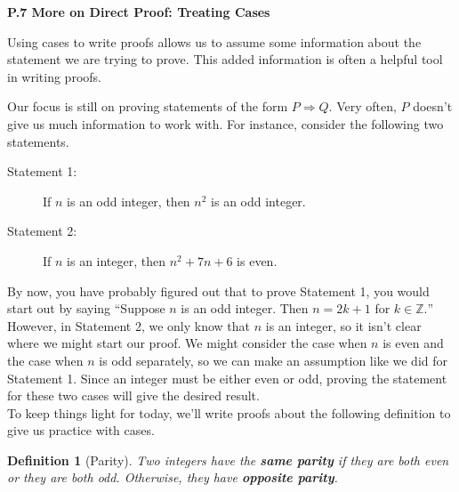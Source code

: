 \documentclass[12 pt]{article}
\newcommand{\Z}{\mathbb{Z}}
\theoremstyle{definition}
\theoremstyle{plain}
\theoremstyle{mytheorem}
\theoremstyle{myexample}
\theoremstyle{mydefinition}
\newtheorem{definition}{Definition}
\begin{document}
\begin{center}
\textbf{P.7 More on Direct Proof: Treating Cases}
\end{center}

Using cases to write proofs allows us to assume some information about the statement we are trying to prove.  This added information is often a helpful tool in writing proofs.

\begin{center}
\end{center}

\noindent Our focus is still on proving statements of the form $P \Rightarrow Q$.  Very often, $P$ doesn't give us much information to work with.  For instance, consider the following two statements.
	\begin{description}
	\item[Statement 1:]  If $n$ is an odd integer, then $n^2$ is an odd integer.
	\item[Statement 2:]  If $n$ is an integer, then $n^2+7n+6$ is even.
	\end{description}
	
By now, you have probably figured out that to prove Statement 1, you would start out by saying ``Suppose $n$ is an odd integer.  Then $n=2k+1$ for $k \in \Z.$''  However, in Statement 2, we only know that $n$ is an integer, so it isn't clear where we might start our proof.  We might consider the case when $n$ is even and the case when $n$ is odd separately, so we can make an assumption like we did for Statement 1.  Since an integer must be either even or odd, proving the statement for these two cases will give the desired result.  \\

To keep things light for today, we'll write proofs about the following definition to give us practice with cases.

\begin{definition}[Parity]  Two integers have the \textbf{same parity} if they are both even or they are both odd.  Otherwise, they have \textbf{opposite parity}.
\end{definition}
\end{document}
